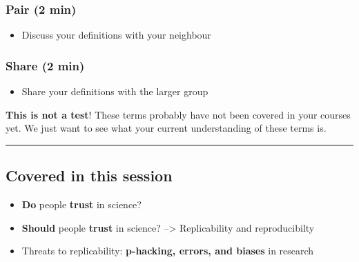\documentclass[
  english,
  letterpaper,
  DIV=11,
  numbers=noendperiod]{scrartcl}
\providecommand{\tightlist}{%
  \setlength{\itemsep}{0pt}\setlength{\parskip}{0pt}}
\begin{document}
\subsubsection{Pair (2 min)}\label{pair-2-min}

\begin{itemize}
\tightlist
\item
  Discuss your definitions with your neighbour
\end{itemize}

\subsubsection{Share (2 min)}\label{share-2-min}

\begin{itemize}
\tightlist
\item
  Share your definitions with the larger group
\end{itemize}

\textbf{This is not a test}! These terms probably have not been covered
in your courses yet. We just want to see what your current understanding
of these terms is.

\begin{center}\rule{0.5\linewidth}{0.5pt}\end{center}

\subsection{Covered in this session}\label{covered-in-this-session}

\begin{itemize}
\tightlist
\item
  \textbf{Do} people \textbf{trust} in science?
\item
  \textbf{Should} people \textbf{trust} in science? --\textgreater{}
  Replicability and reproducibilty
\item
  Threats to replicability: \textbf{p-hacking, errors, and biases} in
  research
\end{itemize}
\end{document}
